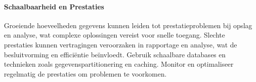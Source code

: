 \paragraph{Schaalbaarheid en Prestaties}
Groeiende hoeveelheden gegevens kunnen leiden tot prestatieproblemen bij opslag en analyse, wat complexe oplossingen vereist voor snelle toegang. Slechte prestaties kunnen vertragingen veroorzaken in rapportage en analyse, wat de besluitvorming en efficiëntie beïnvloedt. Gebruik schaalbare databases en technieken zoals gegevenspartitionering en caching. Monitor en optimaliseer regelmatig de prestaties om problemen te voorkomen.
